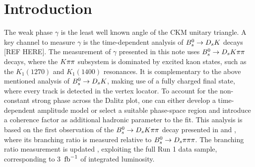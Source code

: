 
\section{Introduction}
\label{sec:Introduction}

The weak phase $\gamma$ is the least well known angle of the CKM unitary triangle. A key channel to measure $\gamma$ is the time-dependent analysis of ${{B}^0_{s}}\rightarrow{\ensuremath{{D}_{s}}}{\ensuremath{K}}$ decays [REF HERE]. \newline
The measurement of $\gamma$ presented in this note uses ${{B}^0_{s}}\rightarrow{\ensuremath{{D}_{s}}}{\ensuremath{K}}\pi\pi$ decays, where the ${K}{\pi}{\pi}$ subsystem 
is dominated by excited kaon states, such as the $K_{1}(1270)$ and $K_{1}(1400)$ resonances. 
It is complementary to the above mentioned analysis of ${{B}^0_{s}}\rightarrow{\ensuremath{{D}_{s}}}{\ensuremath{K}}$, making use of a fully charged final state, where every track is detected in the vertex locator. 
To account for the non-constant strong phase across the Dalitz plot, 
one can either develop a time-dependent amplitude model 
or select a suitable phase-space region and introduce a coherence factor as additional hadronic parameter to the fit. \newline
This analysis is based on the first observation of the ${{B}^0_{s}}\rightarrow{\ensuremath{{D}_{s}}}{\ensuremath{K}}{\ensuremath{\pi}}{\ensuremath{\pi}}$ decay presented in \cite{Blusk:1471393} and \cite{Blusk:2012it}, where its branching ratio is measured relative to ${{B}^0_{s}}\rightarrow{\ensuremath{{D}_{s}}}{\ensuremath{\pi}}{\ensuremath{\pi}}{\ensuremath{\pi}}$. 
The branching ratio measurement is updated
, exploiting the full Run 1 data sample, corresponding to 3 $\mbox{\,fb}^{-1}$ of integrated luminosity.         
